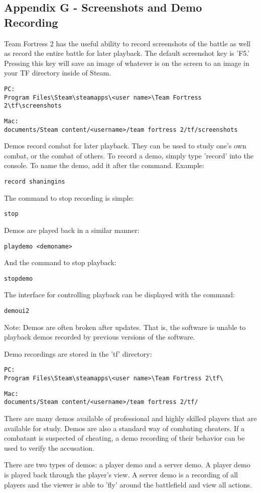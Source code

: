 \subsection{Appendix G - Screenshots and Demo Recording}

Team Fortress 2 has the useful ability to record screenshots of the battle as well as record the entire battle for later playback.  The default screenshot key is 'F5.'  Pressing this key will save an image of whatever is on the screen to an image in your TF directory inside of Steam.
\begin{lstlisting}
PC: 
Program Files\Steam\steamapps\<user name>\Team Fortress 2\tf\screenshots
\end{lstlisting}
\begin{lstlisting}
Mac: 
documents/Steam content/<username>/team fortress 2/tf/screenshots
\end{lstlisting}
Demos record combat for later playback.  They can be used to study one's own combat, or the combat of others.  To record a demo, simply type 'record' into the console.  To name the demo, add it after the command.  Example:
\begin{lstlisting}
record shaningins
\end{lstlisting}
The command to stop recording is simple:
\begin{lstlisting}
stop
\end{lstlisting}
Demos are played back in a similar manner:
\begin{lstlisting}
playdemo <demoname>
\end{lstlisting}
And the command to stop playback:
\begin{lstlisting}
stopdemo
\end{lstlisting}

The interface for controlling playback can be displayed with the command:
\begin{lstlisting}
demoui2
\end{lstlisting}

Note:  Demos are often broken after updates.  That is, the software is unable to playback demos recorded by previous versions of the software.

Demo recordings are stored in the 'tf' directory:
\begin{lstlisting}
PC: 
Program Files\Steam\steamapps\<user name>\Team Fortress 2\tf\
\end{lstlisting}

\begin{lstlisting}
Mac: 
documents/Steam content/<username>/team fortress 2/tf/
\end{lstlisting}

There are many demos available of professional and highly skilled players that are available for study.  Demos are also a standard way of combating cheaters.  If a combatant is suspected of cheating, a demo recording of their behavior can be used to verify the accusation.

There are two types of demos: a player demo and a server demo.  A player demo is played back through the player's view.  A server demo is a recording of all players and the viewer is able to 'fly' around the battlefield and view all actions.